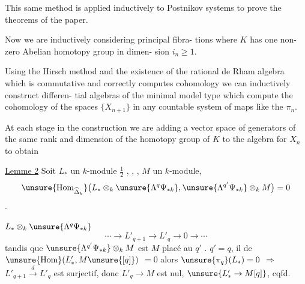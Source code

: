 This same method is applied inductively to Postnikov
systems to prove the theorems of the paper.

Now we are inductively considering principal fibra-
tions
where $K$ has one non-zero Abelian homotopy group in dimen-
sion $i_n\geq1$.

Using the Hirsch method and the existence of the
rational de Rham algebra which is commutative and correctly
computes cohomology we can inductively construct differen-
tial algebras of the minimal model type which compute
the cohomology of the spaces $\{X_{n+1}\}$ in any countable
system of maps like the $\pi_n$.

At each stage in the construction we are adding a
vector space of generators of the same rank and dimension
of the homotopy group of $K$ to the algebra for $X_n$ to obtain

\uline{Lemme 2} Soit $L_*$ un $k$-module $\frac12$ ,
 ,  , $M$ un $k$-module, 
\[
\unsure{\operatorname{Hom}_{\widehat\Delta_k}}
\bigl(L_*\otimes_k\unsure{\Lambda^q\Psi_{* k}},
\unsure{\Lambda^{q'}\Psi_{* k}}\otimes_k M\bigr)=0
\]
.

$L_*\otimes_k\unsure{\Lambda^q\Psi_{* k}}$ 
 
\[
\cdots\longrightarrow L'_{q+1}\longrightarrow L'_q\longrightarrow0\longrightarrow\cdots
\]
tandis que $\unsure{\Lambda^{q'}\Psi_{* k}}\otimes_k M$ est $M$ placé au 
$q'$ .  $q'=q$, il  de 
$\unsure{\operatorname{Hom}}(L'_*,M\unsure{[q]})$
$=0$   
alors $\unsure{\pi_q}(L_*)=0$ $\Rightarrow$ $L'_{q+1}\xrightarrow{d}L'_q$ est surjectif,
donc $L'_q\to M$ est nul, 
  $\unsure{L'_*\to M[q]}$, cqfd.

